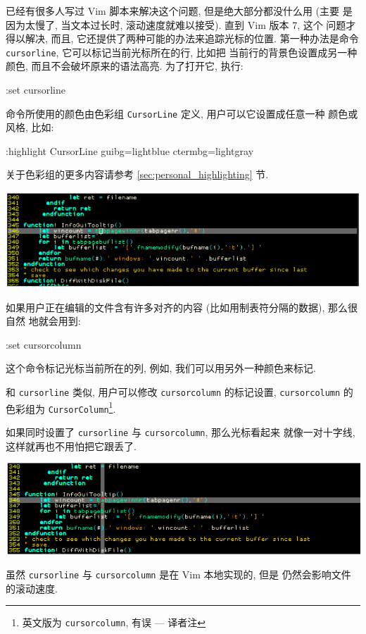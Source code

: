 已经有很多人写过 Vim 脚本来解决这个问题, 但是绝大部分都没什么用 (主要 
是因为太慢了, 当文本过长时, 滚动速度就难以接受). 直到 Vim 版本 7, 这个 
问题才得以解决, 而且, 它还提供了两种可能的办法来追踪光标的位置.
第一种办法是命令 \texttt{cursorline}, 它可以标记当前光标所在的行, 比如把
当前行的背景色设置成另一种颜色, 而且不会破坏原来的语法高亮. 为了打开它,
执行:
\begin{vimcmd}
:set cursorline
\end{vimcmd}
命令所使用的颜色由色彩组 \texttt{CursorLine} 定义, 用户可以它设置成任意一种
颜色或风格, 比如:
\begin{vimcmd}
:highlight CursorLine guibg=lightblue ctermbg=lightgray
\end{vimcmd}
关于色彩组的更多内容请参考 \ref{sec:personal_highlighting} 节.

\begin{center}
    \includegraphics[scale=0.6]{./images/page38-1.png}
\end{center}

如果用户正在编辑的文件含有许多对齐的内容 (比如用制表符分隔的数据), 那么很自然
地就会用到:
\begin{vimcmd}
:set cursorcolumn
\end{vimcmd}

这个命令标记光标当前所在的列, 例如, 我们可以用另外一种颜色来标记.

和 \texttt{cursorline} 类似, 用户可以修改 \texttt{cursorcolumn} 的标记设置,
\texttt{cursorcolumn} 的色彩组为 \texttt{CursorColumn}\footnote{英文版为
\texttt{cursorcolumn}, 有误 --- 译者注}.

如果同时设置了 \texttt{cursorline} 与 \texttt{cursorcolumn}, 那么光标看起来
就像一对十字线, 这样就再也不用怕把它跟丢了.
\begin{center}
    \includegraphics[scale=0.6]{./images/page38-2.png}
\end{center}
\begin{warning}
虽然 \texttt{cursorline} 与 \texttt{cursorcolumn} 是在 Vim 本地实现的, 但是 
仍然会影响文件的滚动速度.
\end{warning}

